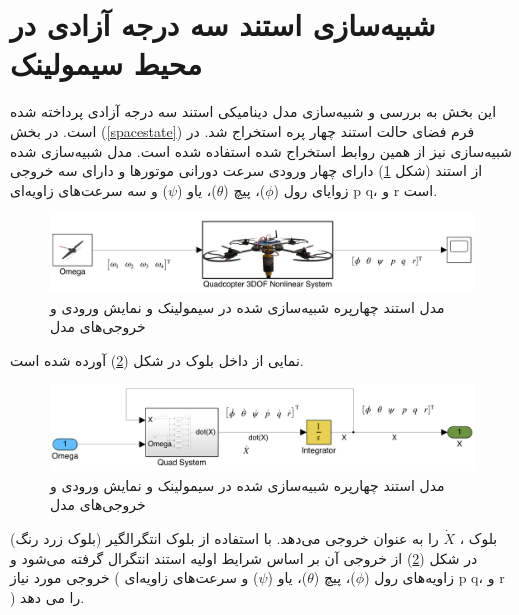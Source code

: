 \section{شبیه‌سازی استند سه درجه آزادی در محیط سیمولینک}\label{quadall3}
این بخش به بررسی و شبیه‌سازی مدل دینامیکی استند سه درجه آزادی پرداخته شده است. در بخش (\ref{spacestate}) فرم فضای حالت استند چهار پره استخراج شد. در شبیه‌سازی نیز از همین روابط استخراج شده استفاده شده است. مدل شبیه‌سازی شده از استند (شکل \ref{quadsimulink}) دارای چهار ورودی سرعت دورانی موتورها  و دارای سه خروجی زوایای رول ($\phi$)، پیچ ($\theta$)، یاو ($\psi$) و  سه سرعت‌های زاویه‌ای
 p
 q،
 و 
r 
 است.
 
 
\begin{figure}[H]
	\includegraphics[width=16cm]{../../Figures/QuadSimulation/Stand_Model.png}
	\centering
	\vspace*{-15mm}
	\caption{مدل استند چهارپره شبیه‌سازی شده در سیمولینک و نمایش ورودی و خروجی‌های مدل}
	\label{quadsimulink}
\end{figure}
نمایی از داخل بلوک
در شکل (\ref{Quad3DOF}) آورده شده است.
\begin{figure}[H]
	\includegraphics[width=16cm]{../../Figures/QuadSimulation/Integrator.png}
	\centering
	\vspace*{-15mm}
	\caption{مدل استند چهارپره شبیه‌سازی شده در سیمولینک و نمایش ورودی و خروجی‌های مدل}
	\label{Quad3DOF}
\end{figure}
بلوک
،
$\dot X$ را به عنوان خروجی می‌دهد. با استفاده از بلوک انتگرالگیر (بلوک زرد رنگ) در شکل
(\ref{Quad3DOF})
از خروجی آن بر اساس شرایط اولیه استند انتگرال گرفته می‌شود و خروجی مورد نیاز ( زاویه‌های رول ($\phi$)، پیچ ($\theta$)، یاو ($\psi$) و سرعت‌های زاویه‌ای‌
p
q،
و 
r )
را می دهد.

